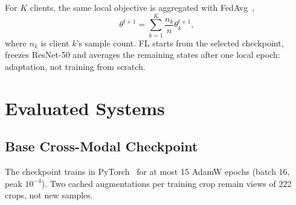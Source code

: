 \documentclass[conference]{IEEEtran}
\begin{document}
For $K$ clients, the same local objective is aggregated with
FedAvg~\cite{McMahan2017},
\begin{equation}
\theta^{t+1}=\sum_{k=1}^{K}\frac{n_k}{n}\theta_k^{t+1},
\label{eq:fedobj}
\end{equation}
where $n_k$ is client $k$'s sample count. FL starts from the selected
checkpoint, freezes ResNet-50 and averages the remaining states after one
local epoch: adaptation, not training from scratch.

\section{Evaluated Systems}
\label{sec:ff}

\subsection{Base Cross-Modal Checkpoint}
\label{sec:proposed}

The checkpoint trains in PyTorch~\cite{Paszke2019} for at most 15 AdamW epochs
(batch 16, peak $10^{-4}$). Two cached augmentations per training crop remain
views of 222 crops, not new samples.
\end{document}
